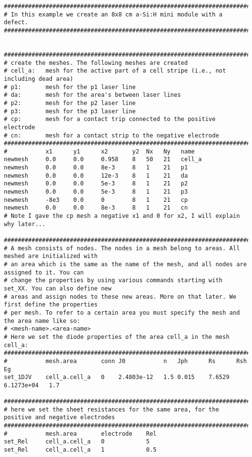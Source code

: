 \documentclass[noshowpacs,preprintnumbers,amsmath,amssymb, letter]{revtex4}
\begin{document}
\begin{small}
\begin{verbatim}
###################################################################################################
# In this example we create an 8x8 cm a-Si:H mini module with a defect.
###################################################################################################


###################################################################################################
# create the meshes. The following meshes are created
# cell_a:	mesh for the active part of a cell stripe (i.e., not including dead area)
# p1:		mesh for the p1 laser line
# da:		mesh for the area's between laser lines
# p2:		mesh for the p2 laser line
# p3:		mesh for the p3 laser line
# cp:		mesh for a contact trip connected to the positive electrode
# cn:		mesh for a contact strip to the negative electrode
###################################################################################################
#           x1      y1      x2       y2  Nx   Ny   name   
newmesh     0.0     0.0     0.958    8   50   21   cell_a
newmesh     0.0     0.0     8e-3     8   1    21   p1
newmesh     0.0     0.0     12e-3    8   1    21   da
newmesh     0.0     0.0     5e-3     8   1    21   p2
newmesh     0.0     0.0     5e-3     8   1    21   p3
newmesh     -8e3    0.0     0        8   1    21   cp
newmesh     0.0     0.0     8e-3     8   1    21   cn
# Note I gave the cp mesh a negative x1 and 0 for x2, I will explain why later...

###################################################################################################
# A mesh consists of nodes. The nodes in a mesh belong to areas. All meshed are initialized with 
# an area which is the same as the name of the mesh, and all nodes are assigned to it. You can 
# change the properties by using various commands starting with set_XX. You can also define new 
# areas and assign nodes to these new areas. More on that later. We first define the properties 
# per mesh. To refer to a certain area you must specify the mesh and the area name like so: 
# <mesh-name>.<area-name>
# Here we set the diode properties of the area cell_a in the mesh cell_a:
###################################################################################################
#           mesh.area       conn J0           n   Jph      Rs      Rsh          Eg
set_1DJV    cell_a.cell_a   0    2.4803e-12   1.5 0.015    7.6529  6.1273e+04   1.7

###################################################################################################
# here we set the sheet resistances for the same area, for the positive and negative electrodes
###################################################################################################
#           mesh.area       electrode    Rel
set_Rel     cell_a.cell_a   0            5
set_Rel     cell_a.cell_a   1            0.5


\end{verbatim}
\end{small}
\end{document}
